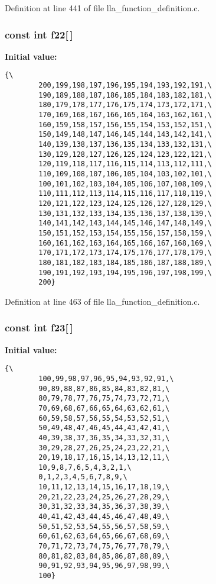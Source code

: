 Definition at line 441 of file lla\_\-function\_\-definition.c.
\subsubsection{\setlength{\rightskip}{0pt plus 5cm}const int {\bf f22}[$\,$]}\label{lla__function__definition_8c_a21}


{\bf Initial value:}

\footnotesize\begin{verbatim}{\
        200,199,198,197,196,195,194,193,192,191,\
        190,189,188,187,186,185,184,183,182,181,\
        180,179,178,177,176,175,174,173,172,171,\
        170,169,168,167,166,165,164,163,162,161,\
        160,159,158,157,156,155,154,153,152,151,\
        150,149,148,147,146,145,144,143,142,141,\
        140,139,138,137,136,135,134,133,132,131,\
        130,129,128,127,126,125,124,123,122,121,\
        120,119,118,117,116,115,114,113,112,111,\
        110,109,108,107,106,105,104,103,102,101,\
        100,101,102,103,104,105,106,107,108,109,\
        110,111,112,113,114,115,116,117,118,119,\
        120,121,122,123,124,125,126,127,128,129,\
        130,131,132,133,134,135,136,137,138,139,\
        140,141,142,143,144,145,146,147,148,149,\
        150,151,152,153,154,155,156,157,158,159,\
        160,161,162,163,164,165,166,167,168,169,\
        170,171,172,173,174,175,176,177,178,179,\
        180,181,182,183,184,185,186,187,188,189,\
        190,191,192,193,194,195,196,197,198,199,\
        200}
\end{verbatim}\normalsize 


Definition at line 463 of file lla\_\-function\_\-definition.c.
\subsubsection{\setlength{\rightskip}{0pt plus 5cm}const int {\bf f23}[$\,$]}\label{lla__function__definition_8c_a22}


{\bf Initial value:}

\footnotesize\begin{verbatim}{\
        100,99,98,97,96,95,94,93,92,91,\
        90,89,88,87,86,85,84,83,82,81,\
        80,79,78,77,76,75,74,73,72,71,\
        70,69,68,67,66,65,64,63,62,61,\
        60,59,58,57,56,55,54,53,52,51,\
        50,49,48,47,46,45,44,43,42,41,\
        40,39,38,37,36,35,34,33,32,31,\
        30,29,28,27,26,25,24,23,22,21,\
        20,19,18,17,16,15,14,13,12,11,\
        10,9,8,7,6,5,4,3,2,1,\
        0,1,2,3,4,5,6,7,8,9,\
        10,11,12,13,14,15,16,17,18,19,\
        20,21,22,23,24,25,26,27,28,29,\
        30,31,32,33,34,35,36,37,38,39,\
        40,41,42,43,44,45,46,47,48,49,\
        50,51,52,53,54,55,56,57,58,59,\
        60,61,62,63,64,65,66,67,68,69,\
        70,71,72,73,74,75,76,77,78,79,\
        80,81,82,83,84,85,86,87,88,89,\
        90,91,92,93,94,95,96,97,98,99,\
        100}
\end{verbatim}\normalsize 


